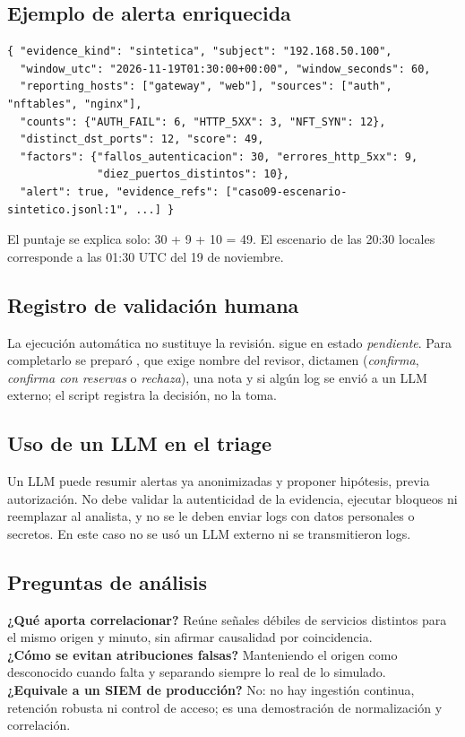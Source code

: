 \subsection{Ejemplo de alerta enriquecida}
\begin{lstlisting}
{ "evidence_kind": "sintetica", "subject": "192.168.50.100",
  "window_utc": "2026-11-19T01:30:00+00:00", "window_seconds": 60,
  "reporting_hosts": ["gateway", "web"], "sources": ["auth", "nftables", "nginx"],
  "counts": {"AUTH_FAIL": 6, "HTTP_5XX": 3, "NFT_SYN": 12},
  "distinct_dst_ports": 12, "score": 49,
  "factors": {"fallos_autenticacion": 30, "errores_http_5xx": 9,
              "diez_puertos_distintos": 10},
  "alert": true, "evidence_refs": ["caso09-escenario-sintetico.jsonl:1", ...] }
\end{lstlisting}
El puntaje se explica solo: 30 + 9 + 10 = 49. El escenario de las 20:30 locales corresponde a las 01:30 UTC del 19 de noviembre.

\subsection{Registro de validación humana}
La ejecución automática no sustituye la revisión.  sigue en estado \emph{pendiente}. Para completarlo se preparó , que exige nombre del revisor, dictamen (\emph{confirma}, \emph{confirma con reservas} o \emph{rechaza}), una nota y si algún log se envió a un LLM externo; el script registra la decisión, no la toma.

\subsection{Uso de un LLM en el triage}
Un LLM puede resumir alertas ya anonimizadas y proponer hipótesis, previa autorización. No debe validar la autenticidad de la evidencia, ejecutar bloqueos ni reemplazar al analista, y no se le deben enviar logs con datos personales o secretos. En este caso no se usó un LLM externo ni se transmitieron logs.

\subsection{Preguntas de análisis}
\textbf{¿Qué aporta correlacionar?} Reúne señales débiles de servicios distintos para el mismo origen y minuto, sin afirmar causalidad por coincidencia.\\
\textbf{¿Cómo se evitan atribuciones falsas?} Manteniendo el origen como desconocido cuando falta y separando siempre lo real de lo simulado.\\
\textbf{¿Equivale a un SIEM de producción?} No: no hay ingestión continua, retención robusta ni control de acceso; es una demostración de normalización y correlación.

